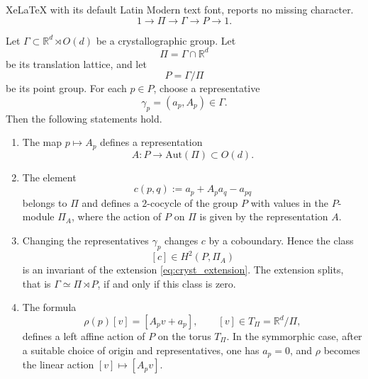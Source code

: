 \documentclass[10pt,a4paper]{amsart}
\begin{document}
XeLaTeX with its default Latin Modern text font, reports no missing character.
\begin{equation}
	1\longrightarrow \Pi \longrightarrow \Gamma \longrightarrow P \longrightarrow 1.
	\label{eq:cryst_extension}
\end{equation}

\begin{proposition}
	\label{prop:affine_point_action}
	Let \(\Gamma\subset \mathbb R^d\rtimes O(d)\) be a crystallographic group. 
	Let
	\[
	\Pi=\Gamma\cap\mathbb R^d
	\]
	be its translation lattice, and let
	\[
	P=\Gamma/\Pi
	\]
	be its point group. 
	For each \(p\in P\), choose a representative
	\[
	\gamma_p=(a_p,A_p)\in\Gamma.
	\]
	Then the following statements hold.
	
	\begin{enumerate}[label=\textup{(\roman*)}]
		\item The map \(p\mapsto A_p\) defines a representation
		\[
		A:P\to \mathrm{Aut}(\Pi)\subset O(d).
		\]
		
		\item The element
		\begin{equation}
			c(p,q):=a_p+A_pa_q-a_{pq}
			\label{eq:extension_cocycle}
		\end{equation}
		belongs to \(\Pi\) and defines a \(2\)-cocycle of the group \(P\) with values in the \(P\)-module \(\Pi_A\), where the action of \(P\) on \(\Pi\) is given by the representation \(A\).
		
		\item Changing the representatives \(\gamma_p\) changes \(c\) by a coboundary. Hence the class
		\[
		[c]\in H^2(P,\Pi_A)
		\]
		is an invariant of the extension \eqref{eq:cryst_extension}. The extension splits, that is \(\Gamma\simeq\Pi\rtimes P\), if and only if this class is zero.
		
		\item The formula
		\begin{equation}
			\rho(p)[v]=[A_pv+a_p],
			\qquad [v]\in T_\Pi=\mathbb R^d/\Pi,
			\label{eq:affine_torus_action}
		\end{equation}
		defines a left affine action of \(P\) on the torus \(T_\Pi\). 
		In the symmorphic case, after a suitable choice of origin and representatives, one has \(a_p=0\), and \(\rho\) becomes the linear action \([v]\mapsto[A_pv]\).
	\end{enumerate}
\end{proposition}
\end{document}
